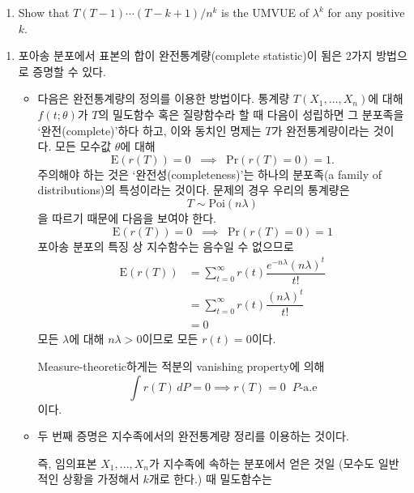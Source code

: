 \documentclass[answers]{exam}
\begin{document}
\begin{questions}
\begin{enumerate}
    \item Show that $T\left(T-1\right)\cdots \left(T-k+1\right)/n^{k}$ is the UMVUE of $\lambda^{k}$ for any positive $k$.
   \end{enumerate}
   \begin{solution}
    \begin{enumerate}
      \item 포아송 분포에서 표본의 합이 완전통계량(complete statistic)이 됨은 2가지 방법으로 증명할 수 있다.
      \begin{itemize}
        \item 다음은 완전통계량의 정의를 이용한 방법이다. 통계량 $T\left(X_{1},\ldots,X_{n}\right)$에 대해 $f\left(t;\theta\right)$가 $T$의 밀도함수 혹은 질량함수라 할 때 다음이 성립하면 그 분포족을 `완전(complete)'하다 하고, 이와 동치인 명제는 $T$가 완전통계량이라는 것이다. 모든 모수값 $\theta$에 대해
        $$
          \mathrm{E}\left(r\left(T\right)\right)=0\;\;\implies\;\;\mathrm{Pr}\left(r\left(T\right)=0\right)=1.
        $$
        주의해야 하는 것은 `완전성(completeness)'는 하나의 분포족(a family of distributions)의 특성이라는 것이다. 문제의 경우 우리의 통계량은
        $$
          T \sim \mathrm{Poi}\left(n\lambda\right)
        $$
        을 따르기 때문에 다음을 보여야 한다.
        \begin{equation}
          \mathrm{E}\left(r\left(T\right)\right) = 0 \;\;\implies \;\; \mathrm{Pr}\left(r\left(T\right)=0\right)=1
        \end{equation}
        포아송 분포의 특징 상 지수함수는 음수일 수 없으므로
        \begin{align}
          \mathrm{E}\left(r\left(T\right)\right) &= \sum_{t=0}^{\infty}r\left(t\right)\dfrac{e^{-n\lambda}\left(n\lambda\right)^{t}}{t!}\\
          &= \sum_{t=0}^{\infty}r\left(t\right)\dfrac{\left(n\lambda\right)^{t}}{t!}\\
          &=0
        \end{align}
        모든 $\lambda$에 대해 $n\lambda > 0$이므로 모든 $r\left(t\right)=0$이다.\par
        Measure-theoretic하게는 적분의 vanishing property에 의해
        \begin{equation}
          \int r\left(T\right)\,dP=0 \implies r\left(T\right)=0\;\;P\text{-a.e}
        \end{equation}
        이다.
        \item 두 번째 증명은 지수족에서의 완전통계량 정리를 이용하는 것이다. \par 즉, 임의표본 $X_{1},\ldots, X_{n}$가 지수족에 속하는 분포에서 얻은 것일 (모수도 일반적인 상황을 가정해서 $k$개로 한다.) 때 밀도함수는

\end{itemize}
\end{enumerate}
\end{solution}
\end{questions}
\end{document}
